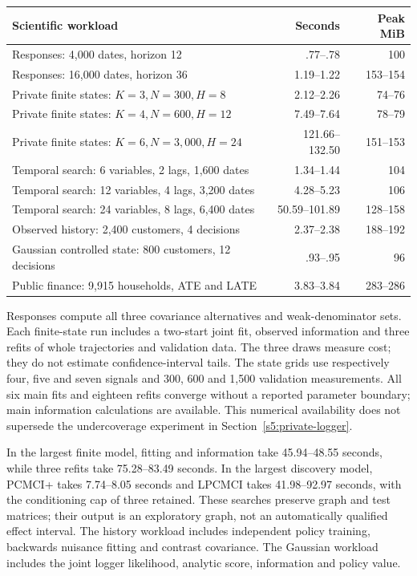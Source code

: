 \begin{center}\small
\begin{tabular}{P{.57\textwidth}rr}\toprule
Scientific workload & Seconds & Peak MiB\\\midrule
Responses: 4,000 dates, horizon 12 & .77--.78 & 100\\
Responses: 16,000 dates, horizon 36 & 1.19--1.22 & 153--154\\
Private finite states: $K=3,N=300,H=8$ & 2.12--2.26 & 74--76\\
Private finite states: $K=4,N=600,H=12$ & 7.49--7.64 & 78--79\\
Private finite states: $K=6,N=3,000,H=24$ & 121.66--132.50 & 151--153\\
Temporal search: 6 variables, 2 lags, 1,600 dates & 1.34--1.44 & 104\\
Temporal search: 12 variables, 4 lags, 3,200 dates & 4.28--5.23 & 106\\
Temporal search: 24 variables, 8 lags, 6,400 dates & 50.59--101.89 & 128--158\\
Observed history: 2,400 customers, 4 decisions & 2.37--2.38 & 188--192\\
Gaussian controlled state: 800 customers, 12 decisions & .93--.95 & 96\\
Public finance: 9,915 households, ATE and LATE & 3.83--3.84 & 283--286\\\bottomrule
\end{tabular}\end{center}
Responses compute all three covariance alternatives and weak-denominator
sets. Each finite-state run includes a two-start joint fit, observed
information and three refits of whole trajectories and validation data. The three draws
measure cost; they do not estimate confidence-interval tails. The state grids
use respectively four, five and seven signals and 300, 600 and 1,500
validation measurements. All six main fits and eighteen refits converge
without a reported parameter boundary; main information calculations are
available. This numerical availability does not supersede the undercoverage
experiment in Section~\ref{s5:private-logger}.

In the largest finite model, fitting and information take 45.94--48.55
seconds, while three refits take 75.28--83.49 seconds. In the largest
discovery model, PCMCI+ takes 7.74--8.05 seconds and LPCMCI takes
41.98--92.97 seconds, with the conditioning cap of three retained.
These searches preserve graph and test matrices; their output is an
exploratory graph, not an automatically qualified effect interval. The
history workload includes independent policy training, backwards nuisance
fitting and contrast covariance. The Gaussian workload includes the joint
logger likelihood, analytic score, information and policy value.

